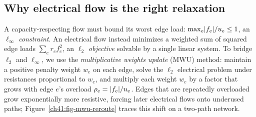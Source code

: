 \subsection{Why electrical flow is the right relaxation}\label{ch41:why-elec}

A capacity-respecting flow must bound its worst edge load: $\max_e \lvert f_e\rvert/u_e \le 1$, an \emph{$\ell_\infty$ constraint}. An electrical flow instead minimizes a weighted sum of squared edge loads $\sum_e r_e f_e^2$, an \emph{$\ell_2$ objective} solvable by a single linear system. To bridge $\ell_2$ and $\ell_\infty$, we use the \emph{multiplicative weights update} (MWU) method: maintain a positive penalty weight $w_e$ on each edge, solve the $\ell_2$ electrical problem under resistances proportional to $w_e$, and multiply each weight $w_e$ by a factor that grows with edge $e$'s overload $\rho_e = \lvert f_e\rvert/u_e$. Edges that are repeatedly overloaded grow exponentially more resistive, forcing later electrical flows onto underused paths; Figure~\ref{ch41:fig-mwu-reroute} traces this shift on a two-path network.

